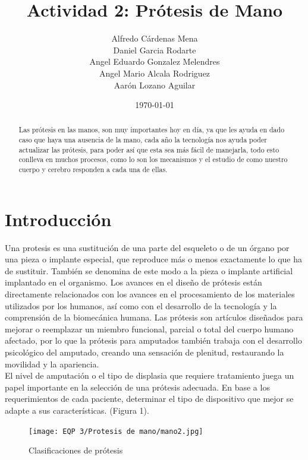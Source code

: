 \documentclass{article}
\author{Alfredo Cárdenas Mena \\
Daniel Garcia Rodarte\\
Angel Eduardo Gonzalez Melendres \\
Angel Mario Alcala Rodriguez \\
Aarón Lozano Aguilar} %
\title{Actividad 2: Prótesis de Mano} %
\date{\today}
\begin{document}

\maketitle %
\begin{abstract} %
Las prótesis en las manos, son muy importantes hoy en día, ya que les ayuda en dado caso que haya una ausencia de la mano, cada año la tecnología nos ayuda poder actualizar las prótesis, para poder así que esta sea más fácil de manejarla, todo esto conlleva en muchos procesos, como lo son los mecanismos y el estudio de como nuestro cuerpo y cerebro responden a cada una de ellas. 
\end{abstract}

\section{Introducción}\label{intro} %

 
Una protesis es una sustitución de una parte del esqueleto o de un órgano por una pieza o implante especial, que reproduce más o menos exactamente lo que ha de sustituir. También se denomina de este modo a la pieza o implante artificial implantado en el organismo. Los avances en el diseño de prótesis están directamente relacionados con los avances en el procesamiento de los materiales utilizados por los humanos, así como con el desarrollo de la tecnología y la comprensión de la biomecánica humana. Las prótesis son artículos diseñados para mejorar o reemplazar un miembro funcional, parcial o total del cuerpo humano afectado, por lo que la prótesis para amputados también trabaja con el desarrollo psicológico del amputado, creando una sensación de plenitud, restaurando la movilidad y la apariencia.
\\
El nivel de amputación o el tipo de displasia que requiere tratamiento juega un papel importante en la selección de una prótesis adecuada. En base a los requerimientos de cada paciente, determinar el tipo de dispositivo que mejor se adapte a sus características. (Figura 1). 

\begin{figure}[H] %
    \centering
    \texttt{[image: EQP 3/Protesis de mano/mano2.jpg]}
    \caption{Clasificaciones de prótesis\cite{EvoProte}}
    \label{grafica}
\end{figure}
\end{document}
